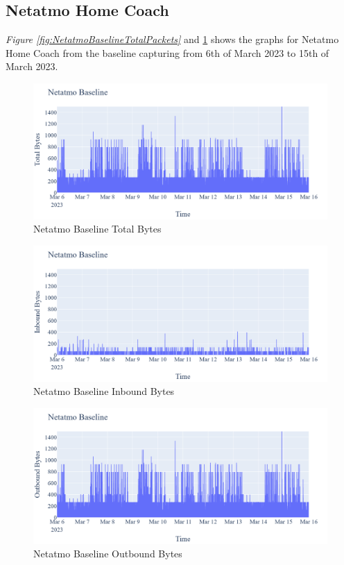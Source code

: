 \subsection{Netatmo Home Coach}
\textit{Figure \ref{fig:NetatmoBaselineTotalPackets}} and \ref{fig:NetatmoBaselineTotalBytes} shows the graphs for Netatmo Home Coach from the baseline capturing from 6th of March 2023 to 15th of March 2023. 
\begin{figure} [!ht]
    \centering
    \includegraphics[scale=0.3]{figures/Netatmo_Baseline_TotalBytes.png}
    \caption{Netatmo Baseline Total Bytes}
    \label{fig:NetatmoBaselineTotalBytes}
\end{figure}

\begin{figure} [!ht]         
    \includegraphics[scale=0.3]{figures/Netatmo_Baseline_InboundBytes.png}
    \caption{Netatmo Baseline Inbound Bytes}
    \label{fig:NetatmoBaselineInboundBytes}
 \end{figure}

\begin{figure} [!ht]         
    \includegraphics[scale=0.3]{figures/Netatmo_Baseline_OutboundBytes.png}
    \caption{Netatmo Baseline Outbound Bytes}
    \label{fig:NetatmoBaselineOutboundBytes}
 \end{figure}


